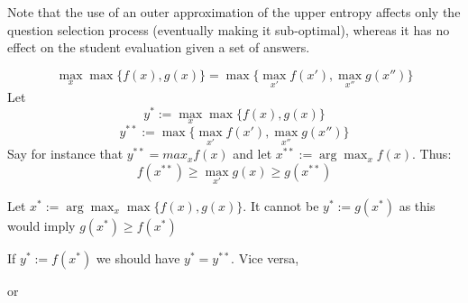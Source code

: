 \documentclass[runningheads]{llncs}
\begin{document}
	Note that the use of an outer approximation of the upper entropy affects only the 
	question selection process (eventually making it sub-optimal), whereas it has no effect 
	on the student evaluation given a set of answers.
	
	

		\begin{theorem}
		\begin{equation}
			\max_{x}  \max \{ f(x) , g(x) \}  
			=
			\max \{ \max_{x'} f(x') , \max_{x''} g(x'') \} 
		\end{equation}
		Let 
		$$y^{*}:=\max_x \max\{f(x),g(x)\}$$
		$$y^{**}:= \max \{ \max_{x'} f(x') , \max_{x''} g(x'') \}$$
		Say for instance that $y^{**}=max_x f(x)$ and let $x^{**}:=\arg\max_x f(x)$. Thus:
		$$f(x^{**})\geq \max_{x'} g(x) \geq g(x^{**})$$ 
		
		Let $x^{*}:= \arg\max_x \max\{f(x),g(x)\}$. 
		It cannot be $y^{*}:=g(x^{*})$ as this would imply $g(x^{*}) \geq f(x^{*})$ 
		
		
		
		
		If $y^{*}:=f(x^{*})$ we should have $y^{*}=y^{**}$.
		Vice versa, 
		
		or
	\end{theorem}
	



\end{document}
